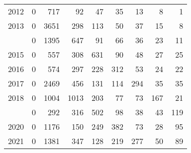 \documentclass[
]{article}
\begin{document}
\begin{longtable}[t]{lrrrrrrrr}
2012 & 0 & 717 & 92 & 47 & 35 & 13 & 8 & 1\\
2013 & 0 & 3651 & 298 & 113 & 50 & 37 & 15 & 8\\
\addlinespace
2014 & 0 & 1395 & 647 & 91 & 66 & 36 & 23 & 11\\
2015 & 0 & 557 & 308 & 631 & 90 & 48 & 27 & 25\\
2016 & 0 & 574 & 297 & 228 & 312 & 53 & 24 & 22\\
2017 & 0 & 2469 & 456 & 131 & 114 & 294 & 35 & 35\\
2018 & 0 & 1004 & 1013 & 203 & 77 & 73 & 167 & 21\\
\addlinespace
2019 & 0 & 292 & 316 & 502 & 98 & 38 & 43 & 119\\
2020 & 0 & 1176 & 150 & 249 & 382 & 73 & 28 & 95\\
2021 & 0 & 1381 & 347 & 128 & 219 & 277 & 50 & 89\\*
\end{longtable}
\end{document}
